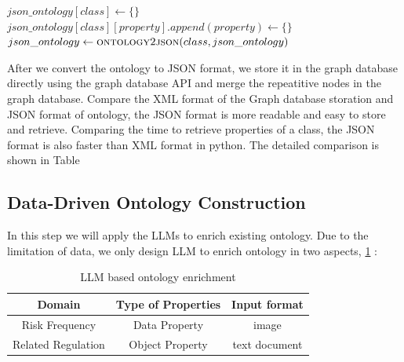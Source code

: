 \begin{algorithm}
\begin{algorithmic}[1]
            \State $json\_ontology[class] \leftarrow \{\}$
                \State $json\_ontology[class][property].append(property) \leftarrow \{\}$   
            \EndFor
            \State $json\_ontology \leftarrow \Call{ontology2json}{class,json\_ontology}$
        \EndFor


    \end{algorithmic}
\end{algorithm}
After we convert the ontology to JSON format, we store it in the graph database directly using the graph database API and merge the repeatitive nodes in the graph database.
Compare the XML format of the Graph database storation and JSON format of ontology,
 the JSON format is more readable and easy to store and retrieve. 
 Comparing the time to retrieve properties of a class, the JSON format is also faster than XML format in python.
 The detailed comparison is shown in Table %


\subsection*{Data-Driven Ontology Construction}
\label{sec:ontology_fining}
In this step we will apply the LLMs to enrich existing ontology. 
Due to the limitation of data, we only design LLM to enrich ontology in two aspects, \ref{tab:ontology_enrichment} :
\begin{table}[htbp]
    \centering
    \label{tab:ontology_enrichment}
    \caption{LLM based ontology enrichment}
    
    \begin{tabular}{ccc}
        \hline
        \textbf{Domain} & \textbf{Type of Properties} & \textbf{Input format} \\
        \hline
        Risk Frequency  &  Data Property              &  image               \\
        Related Regulation & Object Property           &  text document        \\
        \hline

    \end{tabular}
\end{table}
